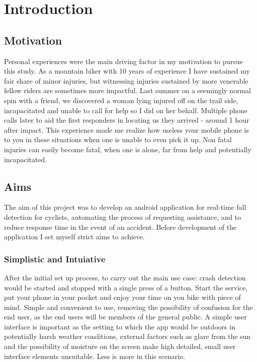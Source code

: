 \chapter{Introduction}

\section{Motivation }

Personal experiences were the main driving factor in my motivation to pursue this study. As a mountain biker with 10 years of experience I have sustained my fair share of minor injuries, but witnessing injuries sustained by more venerable fellow riders are sometimes more impactful. Last summer on a seemingly normal spin with a friend, we discovered a woman lying injured off on the trail side, incapacitated and unable to call for help so I did on her behalf. Multiple phone calls later to aid the first responders in locating us they arrived - around 1 hour after impact.  This experience made me realize how useless your mobile phone is to you in these situations when one is unable to even pick it up. Non fatal injuries can easily become fatal, when one is alone, far from help and potentially incapacitated.




\section{Aims}


The  aim of this project was to develop an android application for real-time fall detection for cyclists,  automating the process of requesting assistance, and to reduce response time in the event of an accident. Before development of the application I set myself strict aims to achieve. 

\subsection*{Simplistic and Intuiative}
After the initial set up process, to carry out the main use case: crash detection would be started and stopped with a single press of a button. Start the service, put your phone in your pocket and enjoy your time on you bike with piece of mind. Simple and convenient to use, removing the possibility of confusion for the end user, as the end users will be members of  the general public.
A simple user interface is important as the setting to which the app would be outdoors in potentially harsh weather conditions, external factors such as glare from the sun  and the possibility of moisture on the screen make high detailed, small user interface elements unsuitable. Less is more in this scenario.

